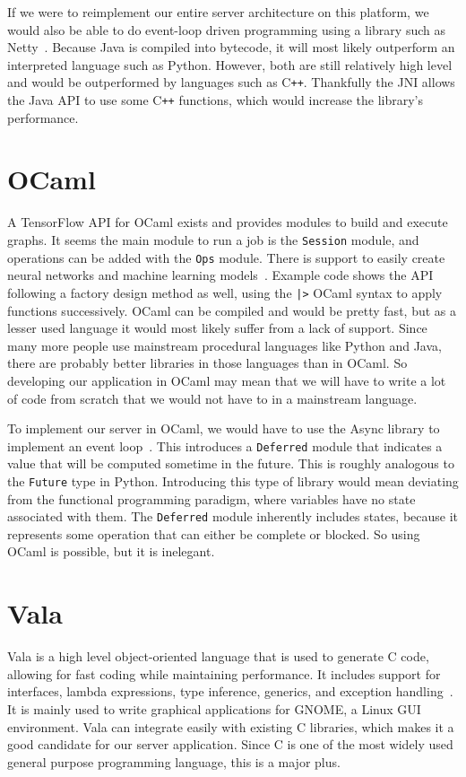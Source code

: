 \documentclass[letterpaper,twocolumn,10pt]{article}
\begin{document}
If we were to reimplement our entire server architecture on this platform, we would also be able to do event-loop driven programming using a library
such as Netty~\cite{nettydocs}. Because Java is compiled into bytecode, it will most likely outperform an interpreted language such as Python. However,
both are still relatively high level and would be outperformed by languages such as C\texttt{++}. Thankfully the JNI allows the Java API to use
some C\texttt{++} functions, which would increase the library's performance.

\section{OCaml}

A TensorFlow API for OCaml exists and provides modules to build and execute graphs. It seems the main module to run a job is the \texttt{Session} module,
and operations can be added with the \texttt{Ops} module. There is support to easily create neural networks and machine learning models~\cite{ocamlgithub}.
Example code shows the API following a factory design method as well, using the \texttt{|>} OCaml syntax to apply functions successively. OCaml can
be compiled and would be pretty fast, but as a lesser used language it would most likely suffer from a lack of support. Since many more people use mainstream
procedural languages like Python and Java, there are probably better libraries in those languages than in OCaml. So developing our application in OCaml
may mean that we will have to write a lot of code from scratch that we would not have to in a mainstream language.

To implement our server in OCaml, we would have to use the Async library to implement an event loop~\cite{ocamlasync}. This introduces a \texttt{Deferred}
module that indicates a value that will be computed sometime in the future. This is roughly analogous to the \texttt{Future} type in Python. Introducing
this type of library would mean deviating from the functional programming paradigm, where variables have no state associated with them. The
\texttt{Deferred} module inherently includes states, because it represents some operation that can either be complete or blocked. So using OCaml
is possible, but it is inelegant.

\section{Vala}

Vala is a high level object-oriented language that is used to generate C code, allowing for fast coding while maintaining performance.
It includes support for interfaces, lambda expressions, type inference, generics, and exception handling~\cite{valaabout}. It is mainly used to write
graphical applications for GNOME, a Linux GUI environment. Vala can integrate easily with existing C libraries, which makes it a good candidate
for our server application. Since C is one of the most widely used general purpose programming language, this is a major plus.
\end{document}
